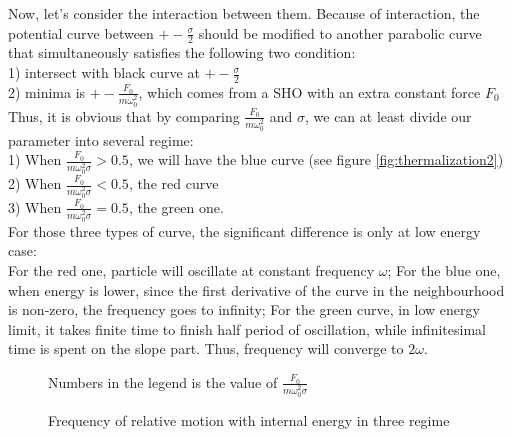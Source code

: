 \documentclass[aps,pre,twocolumn
,groupedaddress]{revtex4-1}
\begin{document}
Now, let's consider the interaction between them. Because of interaction, the potential curve between $+-\frac{\sigma}{2}$ should be modified to another parabolic curve that simultaneously satisfies the following two condition:\\
1) intersect with black curve at $+-\frac{\sigma}{2}$\\
2) minima is $+-\frac{F_0}{m\omega_0^2}$, which comes from a SHO with an extra constant force $F_0$\\
Thus, it is obvious that by comparing $\frac{F_0}{m\omega_0^2}$ and $\sigma$, we can at least divide our parameter into several regime:\\
1) When $\frac{F_0}{m\omega_0^2\sigma}>0.5$, we will have the blue curve (see figure \ref{fig:thermalization2})\\
2) When $\frac{F_0}{m\omega_0^2\sigma}<0.5$, the red curve\\
3) When $\frac{F_0}{m\omega_0^2\sigma}=0.5$, the green one.\\
For those three types of curve, the significant difference is only at low energy case:\\
For the red one, particle will oscillate at constant frequency $\omega$;
For the blue one, when energy is lower, since the first derivative of the curve in the neighbourhood is non-zero, the frequency goes to infinity;
For the green curve, in low energy limit, it takes finite time to finish half period of oscillation, while infinitesimal time is spent on the slope part. Thus, frequency will converge to  $2\omega$.

\begin{figure}
\centering
\caption{Frequency of relative motion with internal energy in three regime} Numbers in the legend is the value of $\frac{F_0}{m\omega_0^2\sigma}$
\label{fig:thermalization3}
\end{figure}



 
 
\end{document}
